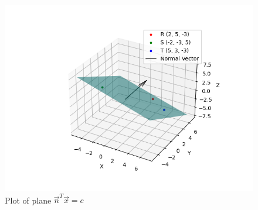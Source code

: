 \documentclass[journal]{IEEEtran}
\begin{document}
\begin{figure}[h!]
   \centering
   \includegraphics[width=0.6\linewidth]{figs/01.png}
   \caption{Plot of plane $\vec{n}^{T}\vec{x} = c$}
   \label{Plot_1}
\end{figure}
\end{document}
